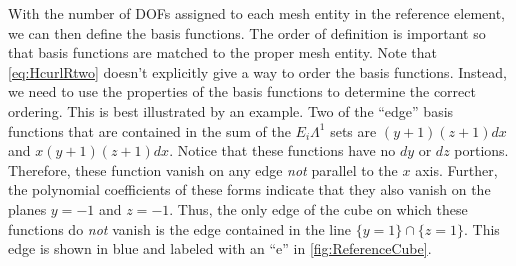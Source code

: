 \documentclass[format=acmsmall,screen,timestamp=false,a4paper]{acmart}
\begin{document}
With the number of DOFs assigned to each mesh entity in the reference element, we can then define the basis functions.  The order of definition is important so that basis functions are matched to the proper mesh entity.  Note that \cref{eq:HcurlRtwo} doesn't explicitly give a way to order the basis functions.  Instead, we need to use the properties of the basis functions to determine the correct ordering.   This is best illustrated by an example. Two of the ``edge'' basis functions that are contained in the sum of the $E_i\Lambda^1$ sets are $(y+1)(z+1)dx$ and $x(y+1)(z+1)dx$.  Notice that these functions have no $dy$ or $dz$ portions.  Therefore, these function vanish on any edge \textit{not} parallel to the $x$ axis.  Further, the polynomial coefficients of these forms indicate that they also vanish on the planes $y=-1$ and $z=-1$.  Thus, the only edge of the cube on which these functions do \textit{not} vanish is the edge contained in the line $\{y=1\}\cap\{z=1\}$.  This edge is shown in blue and labeled with an ``e'' in \cref{fig:ReferenceCube}.
\end{document}

